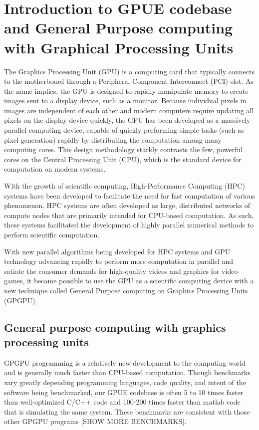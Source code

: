 \chapter{Introduction to GPUE codebase and General Purpose computing with Graphical Processing Units}
\label{ch-gpu}

The Graphics Processing Unit (GPU) is a computing card that typically connects to the motherboard through a Peripheral Component Interconnect (PCI) slot.
As the name implies,
the GPU is designed to rapidly manipulate memory to create images sent to a display device, such as a monitor.
Because individual pixels in images are independent of each other and modern computers require updating all pixels on the display device quickly, the GPU has been developed as a massively parallel computing device, capable of quickly performing simple tasks (such as pixel generation) rapidly by distributing the computation among many computing cores.
This design methodology starkly contrasts the few, powerful cores on the Central Processing Unit (CPU), which is the standard device for computation on modern systems.

With the growth of scientific computing, High-Performance Computing (HPC) systems have been developed to facilitate the need for fast computation of various phenomenon.
HPC systems are often developed as large, distributed networks of compute nodes that are primarily intended for CPU-based computation.
As such, these systems facilitated the development of highly parallel numerical methods to perform scientific computation.

With new parallel algorithms being developed for HPC systems and GPU technology advancing rapidly to perform more computation in parallel and satiate the consumer demands for high-quality videos and graphics for video games, it became possible to use the GPU as a scientific computing device with a new technique called General Purpose computing on Graphics Processing Units (GPGPU).

\section{General purpose computing with graphics processing units}

GPGPU programming is a relatively new development to the computing world and is generally much faster than CPU-based computation.
Though benchmarks vary greatly depending programming languages, code quality, and intent of the software being benchmarked, our GPUE codebase is often 5 to 10 times faster than well-optimized C/C++ code and 100-200 times faster than matlab code that is simulating the same system.
These benchmarks are consistent with those other GPGPU programs [SHOW MORE BENCHMARKS].


